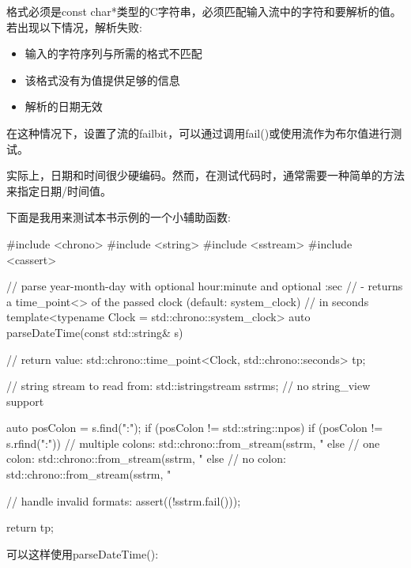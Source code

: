 格式必须是const char*类型的C字符串，必须匹配输入流中的字符和要解析的值。若出现以下情况，解析失败:

\begin{itemize}
\item 
输入的字符序列与所需的格式不匹配

\item 
该格式没有为值提供足够的信息

\item 
解析的日期无效
\end{itemize}

在这种情况下，设置了流的failbit，可以通过调用fail()或使用流作为布尔值进行测试。


实际上，日期和时间很少硬编码。然而，在测试代码时，通常需要一种简单的方法来指定日期/时间值。

下面是我用来测试本书示例的一个小辅助函数:


\begin{cpp}
#include <chrono>
#include <string>
#include <sstream>
#include <cassert>

// parse year-month-day with optional hour:minute and optional :sec
// - returns a time_point<> of the passed clock (default: system_clock)
// in seconds
template<typename Clock = std::chrono::system_clock>
auto parseDateTime(const std::string& s)
{
	// return value:
	std::chrono::time_point<Clock, std::chrono::seconds> tp;
	
	// string stream to read from:
	std::istringstream sstrm{s}; // no string_view support
	
	auto posColon = s.find(":");
	if (posColon != std::string::npos) {
		if (posColon != s.rfind(":")) {
			// multiple colons:
			std::chrono::from_stream(sstrm, "%
		}
		else {
			// one colon:
			std::chrono::from_stream(sstrm, "%
		}
	}
	else {
		// no colon:
		std::chrono::from_stream(sstrm, "%
	}
	
	// handle invalid formats:
	assert((!sstrm.fail()));
	
	return tp;
}
\end{cpp}

可以这样使用parseDateTime():



